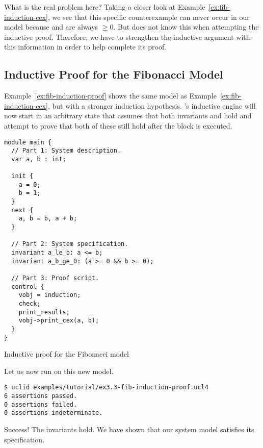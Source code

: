 What is the real problem here? Taking a closer look at Example~\ref{ex:fib-induction-cex}, we see that this specific counterexample can never occur in our model because  and  are always $\ge 0$. But \uclid{} does not know this when attempting the inductive proof. Therefore, we have to strengthen the inductive argument with this information in order to help \uclid{} complete its proof.

\subsection{Inductive Proof for the Fibonacci Model}

Example~\ref{ex:fib-induction-proof} shows the same model as Example~\ref{ex:fib-induction-cex}, but with a stronger induction hypothesis. \uclid{}'s inductive engine will now start in an arbitrary state that assumes that both invariants  and  hold and attempt to prove that both of these still hold after the  block is executed.

\begin{uclidlisting}[htbp]
\begin{lstlisting}[language=uclid,style=uclidstyle]
module main {
  // Part 1: System description.
  var a, b : int;

  init {
    a = 0;
    b = 1;
  }
  next {
    a, b = b, a + b;
  }

  // Part 2: System specification.
  invariant a_le_b: a <= b;
  invariant a_b_ge_0: (a >= 0 && b >= 0);

  // Part 3: Proof script.
  control {
    vobj = induction;
    check;
    print_results;
    vobj->print_cex(a, b);
  }
}
\end{lstlisting}
\caption{Inductive proof for the Fibonacci model}
\label{ex:fib-induction-proof}
\end{uclidlisting}

Let us now run \uclid{} on this new model.

\begin{Verbatim}[frame=single, samepage=true]
$ uclid examples/tutorial/ex3.3-fib-induction-proof.ucl4 
6 assertions passed.
0 assertions failed.
0 assertions indeterminate.
\end{Verbatim}

Success! The invariants hold. We have shown that our system model satisfies its specification.

